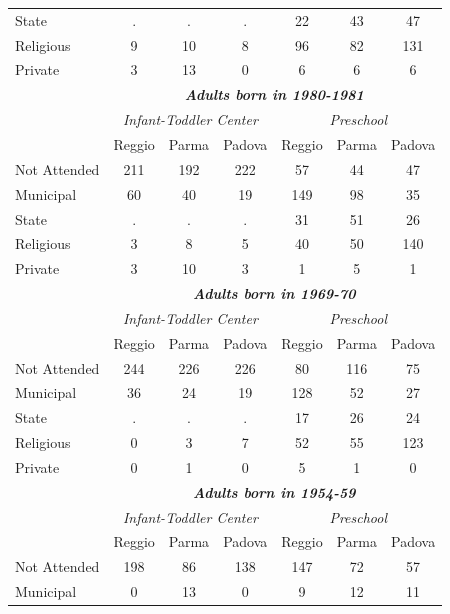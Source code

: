 \documentclass[12pt]{article}
\begin{document}
\begin{table}[ht]
\begin{center}
\begin{tabular}{l ccc|ccc}
State           &   . &   . &   . &  22 &  43 &  47 \\ 
Religious       &   9 &  10 &   8 &  96 &  82 & 131 \\ 
Private         &   3 &  13 &   0 &   6 &   6 &   6 \\ \hline
%
%
\rule{0pt}{1.2\normalbaselineskip}
 & \multicolumn{6}{c}{\textit{\textbf{Adults born in 1980-1981}}} \\ 
 & \multicolumn{3}{c}{\textit{Infant-Toddler Center}} & \multicolumn{3}{c}{\textit{Preschool}} \\ 
 & Reggio & Parma & Padova & Reggio & Parma & Padova \\ \hline
Not Attended    & 211 & 192 & 222 &  57 &  44 &  47 \\ 
Municipal       & 60  &  40 &  19 & 149 &  98 &  35 \\ 
State           &   . &   . &   . &  31 &  51 &  26 \\ 
Religious       &   3 &   8 &   5 &  40 &  50 & 140 \\ 
Private         &   3 &  10 &   3 &   1 &   5 &   1 \\ \hline
%
%
\rule{0pt}{1.2\normalbaselineskip}
 & \multicolumn{6}{c}{\textit{\textbf{Adults born in 1969-70}}} \\ 
 & \multicolumn{3}{c}{\textit{Infant-Toddler Center}} & \multicolumn{3}{c}{\textit{Preschool}} \\ 
 & Reggio & Parma & Padova & Reggio & Parma & Padova \\ \hline
Not Attended    & 244 & 226 & 226 &  80 & 116 &  75 \\ 
Municipal       & 36  &  24 &  19 & 128 &  52 &  27 \\ 
State           &   . &   . &   . &  17 &  26 &  24 \\ 
Religious       &   0 &   3 &   7 &  52 &  55 & 123 \\ 
Private         &   0 &   1 &   0 &   5 &   1 &   0 \\ \hline
%
%
\rule{0pt}{1.2\normalbaselineskip}
 & \multicolumn{6}{c}{\textit{\textbf{Adults born in 1954-59}}} \\ 
 & \multicolumn{3}{c}{\textit{Infant-Toddler Center}} & \multicolumn{3}{c}{\textit{Preschool}} \\ 
 & Reggio & Parma & Padova & Reggio & Parma & Padova \\ \hline
Not Attended    & 198 &  86 & 138 & 147 &  72 &  57 \\ 
Municipal       &  0  &  13 &   0 &   9 &  12 &  11 \\ 

\end{tabular}
\end{center}
\end{table}
\end{document}
